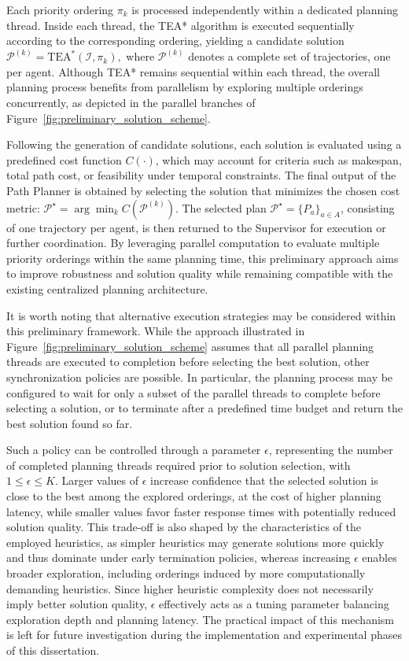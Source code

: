 Each priority ordering \(\pi_k\) is processed independently within a dedicated planning thread. Inside each thread, the TEA* algorithm is executed sequentially according to the corresponding ordering, yielding a candidate solution
$
\mathcal{P}^{(k)} = \mathrm{TEA}^\ast(\mathcal{I}, \pi_k),
$
where \(\mathcal{P}^{(k)}\) denotes a complete set of trajectories, one per agent. Although TEA* remains sequential within each thread, the overall planning process benefits from parallelism by exploring multiple orderings concurrently, as depicted in the parallel branches of Figure~\ref{fig:preliminary_solution_scheme}.

Following the generation of candidate solutions, each solution is evaluated using a predefined cost function \(C(\cdot)\), which may account for criteria such as makespan, total path cost, or feasibility under temporal constraints. The final output of the Path Planner is obtained by selecting the solution that minimizes the chosen cost metric:
$
\mathcal{P}^\star = \arg\min_k C(\mathcal{P}^{(k)}).
$
The selected plan \(\mathcal{P}^\star = \{P_a\}_{a \in A}\), consisting of one trajectory per agent, is then returned to the Supervisor for execution or further coordination. By leveraging parallel computation to evaluate multiple priority orderings within the same planning time, this preliminary approach aims to improve robustness and solution quality while remaining compatible with the existing centralized planning architecture.

It is worth noting that alternative execution strategies may be considered within this preliminary framework. While the approach illustrated in Figure~\ref{fig:preliminary_solution_scheme} assumes that all parallel planning threads are executed to completion before selecting the best solution, other synchronization policies are possible. In particular, the planning process may be configured to wait for only a subset of the parallel threads to complete before selecting a solution, or to terminate after a predefined time budget and return the best solution found so far.

Such a policy can be controlled through a parameter $\epsilon$, representing the number of completed planning threads required prior to solution selection, with $1 \leq \epsilon \leq K$. Larger values of $\epsilon$ increase confidence that the selected solution is close to the best among the explored orderings, at the cost of higher planning latency, while smaller values favor faster response times with potentially reduced solution quality. This trade-off is also shaped by the characteristics of the employed heuristics, as simpler heuristics may generate solutions more quickly and thus dominate under early termination policies, whereas increasing $\epsilon$ enables broader exploration, including orderings induced by more computationally demanding heuristics. Since higher heuristic complexity does not necessarily imply better solution quality, $\epsilon$ effectively acts as a tuning parameter balancing exploration depth and planning latency. The practical impact of this mechanism is left for future investigation during the implementation and experimental phases of this dissertation.



